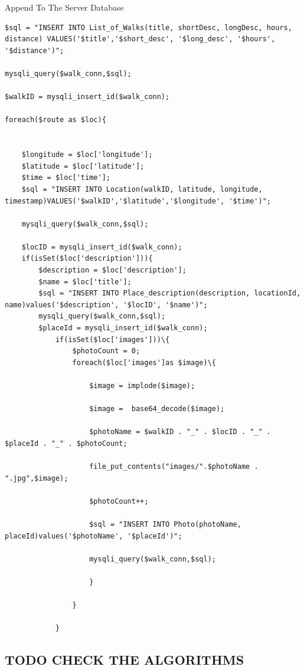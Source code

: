\documentclass[12pt]{article}
\makeatletter
\renewcommand{\paragraph}{
  \@startsection{paragraph}{4}
  {\z@}{3.25ex \@plus -10em \@minus 1em}{0.1em}
  {\normalfont\normalsize\bfseries}
}
\makeatother
\begin{document}
\paragraph{Append To The Server Database}
\begin{adjustwidth}{-3cm}{-3cm}
\begin{lstlisting}
$sql = "INSERT INTO List_of_Walks(title, shortDesc, longDesc, hours, distance) VALUES('$title','$short_desc', '$long_desc', '$hours', '$distance')"; 

mysqli_query($walk_conn,$sql);
    
$walkID = mysqli_insert_id($walk_conn);	
		
foreach($route as $loc){
       
			
	$longitude = $loc['longitude'];           
	$latitude = $loc['latitude'];            
	$time = $loc['time'];			
	$sql = "INSERT INTO Location(walkID, latitude, longitude, timestamp)VALUES('$walkID','$latitude','$longitude', '$time')";
            
	mysqli_query($walk_conn,$sql);
        
	$locID = mysqli_insert_id($walk_conn);
	if(isSet($loc['description'])){			
		$description = $loc['description'];
		$name = $loc['title'];
		$sql = "INSERT INTO Place_description(description, locationId, name)values('$description', '$locID', '$name')";
		mysqli_query($walk_conn,$sql);
		$placeId = mysqli_insert_id($walk_conn);
			if(isSet($loc['images']))\{
				$photoCount = 0;
				foreach($loc['images']as $image)\{
				
					$image = implode($image);
						
					$image =  base64_decode($image);
						
					$photoName = $walkID . "_" . $locID . "_" . $placeId . "_" . $photoCount;
						
					file_put_contents("images/".$photoName . ".jpg",$image);
						
					$photoCount++;
						
					$sql = "INSERT INTO Photo(photoName, placeId)values('$photoName', '$placeId')";
						
					mysqli_query($walk_conn,$sql);
						
					}
					
				}
				
			}
\end{lstlisting}
\end{adjustwidth}
\subsection{TODO CHECK THE ALGORITHMS}
\end{document}
